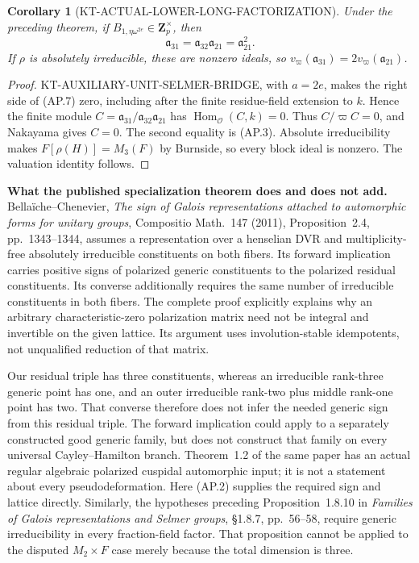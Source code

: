 \documentclass[11pt,a4paper]{article}
\newtheorem{corollary}[theorem]{Corollary}
\theoremstyle{definition}
\renewcommand{\paragraph}[1]{\par\smallskip\noindent\textbf{#1}\quad\ignorespaces}
\begin{document}
\begin{corollary}[KT-ACTUAL-LOWER-LONG-FACTORIZATION]
Under the preceding theorem, if
$B_{1,\eta\omega^{2e}}\in\mathbf Z_p^\times$, then
\[
              \mathfrak a_{31}
                =\mathfrak a_{32}\mathfrak a_{21}
                =\mathfrak a_{21}^{2}.                     \tag{AP.12}
\]
If $\rho$ is absolutely irreducible, these are nonzero ideals,
so $v_\varpi(\mathfrak a_{31})=2v_\varpi(\mathfrak a_{21})$.
\end{corollary}
\begin{proof}
KT-AUXILIARY-UNIT-SELMER-BRIDGE, with $a=2e$, makes
the right side of (AP.7) zero, including after the finite
residue-field extension to $k$.  Hence the finite module
$C=\mathfrak a_{31}/\mathfrak a_{32}\mathfrak a_{21}$
has $\operatorname{Hom}_{\mathcal O}(C,k)=0$.
Thus $C/\varpi C=0$, and Nakayama gives $C=0$.
The second equality is (AP.3).  Absolute irreducibility
makes $F[\rho(H)]=M_3(F)$ by Burnside, so every block
ideal is nonzero.  The valuation identity follows.
\end{proof}

\paragraph{What the published specialization theorem does and does not add.}
Bella\"iche--Chenevier, \emph{The sign of Galois representations
attached to automorphic forms for unitary groups},
Compositio Math.\ 147 (2011), Proposition~2.4, pp.~1343--1344,
assumes a representation over a henselian DVR and
multiplicity-free absolutely irreducible constituents on
both fibers.  Its forward implication carries positive
signs of polarized generic constituents to the polarized
residual constituents.  Its converse additionally requires
the same number of irreducible constituents in both fibers.
The complete proof explicitly explains why an arbitrary
characteristic-zero polarization matrix need not be integral
and invertible on the given lattice.  Its argument uses
involution-stable idempotents, not unqualified reduction of
that matrix.

Our residual triple has three constituents, whereas an
irreducible rank-three generic point has one, and an outer
irreducible rank-two plus middle rank-one point has two.
That converse therefore does not infer the needed generic
sign from this residual triple.  The forward implication
could apply to a separately constructed good generic family,
but does not construct that family on every universal
Cayley--Hamilton branch.  Theorem~1.2 of the same paper has
an actual regular algebraic polarized cuspidal automorphic
input; it is not a statement about every pseudodeformation.
Here (AP.2) supplies the required sign and lattice directly.
Similarly, the hypotheses preceding Proposition~1.8.10 in
\emph{Families of Galois representations and Selmer groups},
\S1.8.7, pp.~56--58, require generic irreducibility in
every fraction-field factor.  That proposition cannot be
applied to the disputed $M_2\times F$ case merely because
the total dimension is three.
\end{document}
